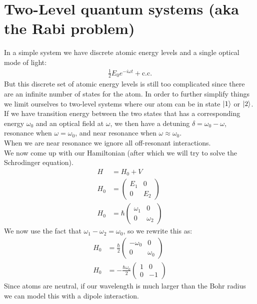 \section{Two-Level quantum systems (aka the Rabi problem)}
In a simple system we have discrete atomic energy levels and a single optical mode of light:
\begin{align*}
	\frac{1}{2} E_0 e^{-i\omega t} + \text{c.c.}
\end{align*}
But this discrete set of atomic energy levels is still too complicated since there are an infinite number of states for the atom. In order to further simplify things we limit ourselves to two-level systems where our atom can be in state $\ket{1}$ or $\ket{2}$.\\
If we have transition energy between the two states that has a corresponding energy $\omega_0$ and an optical field at $\omega$, we then have a detuning $\delta = \omega_0-\omega$, resonance when $\omega=\omega_0$, and near resonance when $\omega\approx\omega_0$.\\
When we are near resonance we ignore all off-resonant interactions.\\
We now come up with our Hamiltonian (after which we will try to solve the Schrodinger equation).
\begin{align*}
	H &= H_0 + V \\
	H_0 &= \begin{pmatrix} E_1 & 0 \\ 0 & E_2\end{pmatrix} \\
	H_0 &= \hbar\begin{pmatrix} \omega_1 & 0 \\ 0 & \omega_2\end{pmatrix}
\end{align*}
We now use the fact that $\omega_1 - \omega_2 = \omega_0$, so we rewrite this as:
\begin{align*}
	H_0 &= \frac{\hbar}{2}\begin{pmatrix} -\omega_0 & 0 \\ 0 & \omega_0\end{pmatrix} \\
	H_0 &= -\frac{\hbar\omega_0}{2}\begin{pmatrix} 1 & 0 \\ 0 & -1\end{pmatrix}
\end{align*}
Since atoms are neutral, if our wavelength is much larger than the Bohr radius we can model this with a dipole interaction.\\
